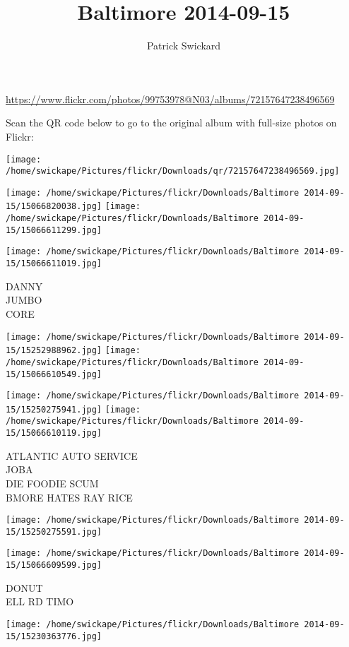 \documentclass[10pt,letterpaper]{article}
\title{Baltimore 2014-09-15}
\author{Patrick Swickard}
\date{}
\begin{document}
\maketitle

\url{https://www.flickr.com/photos/99753978@N03/albums/72157647238496569}

Scan the QR code below to go to the original album with full-size photos on Flickr:

\texttt{[image: /home/swickape/Pictures/flickr/Downloads/qr/72157647238496569.jpg]}
\pagebreak

\texttt{[image: /home/swickape/Pictures/flickr/Downloads/Baltimore 2014-09-15/15066820038.jpg]}
\texttt{[image: /home/swickape/Pictures/flickr/Downloads/Baltimore 2014-09-15/15066611299.jpg]}

\vspace{0.25in}
\texttt{[image: /home/swickape/Pictures/flickr/Downloads/Baltimore 2014-09-15/15066611019.jpg]}

DANNY\\
JUMBO\\
CORE
\pagebreak

\texttt{[image: /home/swickape/Pictures/flickr/Downloads/Baltimore 2014-09-15/15252988962.jpg]}
\texttt{[image: /home/swickape/Pictures/flickr/Downloads/Baltimore 2014-09-15/15066610549.jpg]}

\texttt{[image: /home/swickape/Pictures/flickr/Downloads/Baltimore 2014-09-15/15250275941.jpg]}
\texttt{[image: /home/swickape/Pictures/flickr/Downloads/Baltimore 2014-09-15/15066610119.jpg]}

ATLANTIC AUTO SERVICE\\
JOBA\\
DIE FOODIE SCUM\\
BMORE HATES RAY RICE
\pagebreak

\texttt{[image: /home/swickape/Pictures/flickr/Downloads/Baltimore 2014-09-15/15250275591.jpg]}

\vspace{0.25in}
\texttt{[image: /home/swickape/Pictures/flickr/Downloads/Baltimore 2014-09-15/15066609599.jpg]}

DONUT\\
ELL RD TIMO
\pagebreak

\texttt{[image: /home/swickape/Pictures/flickr/Downloads/Baltimore 2014-09-15/15230363776.jpg]}
\end{document}
